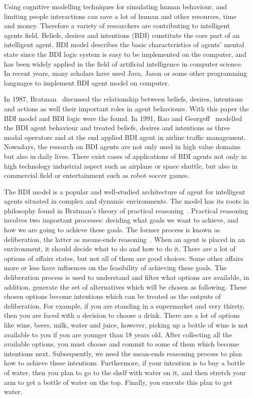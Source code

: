 Using cognitive modelling techniques for simulating human behaviour, and limiting people interactions can save a lot of human and other resources, time and money.
Therefore a variety of researchers are contributing to intelligent agents field.
Beliefs, desires and intentions (BDI) constitute the core part of an intelligent agent.
BDI model describes the basic characteristics of agents' mental state since the BDI logic system is easy to be implemented on the computer, and has been widely applied in the field of artificial intelligence in computer science.
In recent years, many scholars have used Java, Jason or some other programming languages to implement BDI agent model on computer.

In 1987, Bratman~\cite{MICHAEL_PlansResource_1988} discussed the relationship between beliefs, desires, intentions and actions as well their important roles in agent behaviours.
With this paper the BDI model and BDI logic were the found.
In 1991, Rao and Georgeff~\cite{Michael_BDIAgency_1999} modelled the BDI agent behaviour and treated beliefs, desires and intentions as three modal operators and at the end applied BDI agent in airline traffic management.
Nowadays, the research on BDI agents are not only used in high value domains but also in daily lives.
There exist cases of applications of BDI agents not only in high technology industrial aspect such as airplane or space shuttle, but also in commercial field or entertainment such as robot soccer games.

The BDI model is a popular and well-studied architecture of agent for intelligent agents situated in complex and dynamic environments.
The model has its roots in philosophy found in Bratman’s theory of practical reasoning~\cite{Sebastian_Hierarchical_2006}.
Practical reasoning involves two important processes: deciding what goals we want to achieve, and how we are going to achieve these goals.
The former process is known as deliberation, the latter as means-ends reasoning~\cite{Gerhard_MultiSystem_1999}.
When an agent is placed in an environment, it should decide what to do and how to do it.
There are a lot of options of affairs states, but not all of them are good choices.
Some other affairs more or less have influences on the feasibility of achieving these goals.
The deliberation process is used to understand and filter what options are available, in addition, generate the set of alternatives which will be chosen as following.
These chosen options become intentions which can be treated as the outputs of deliberation.
For example, if you are standing in a supermarket and very thirsty, then you are faced with a decision to choose a drink.
There are a lot of options like wine, beers, milk, water and juice, however, picking up a bottle of wine is not available to you if you are younger than 18 years old.
After collecting all the available options, you must choose and commit to some of them which become intentions next.
Subsequently, we need the mean-ends reasoning process to plan how to achieve these intentions.
Furthermore, if your intention is to buy a bottle of water, then you plan to go to the shelf with water on it, and then stretch your arm to get a bottle of water on the top.
Finally, you execute this plan to get water.

